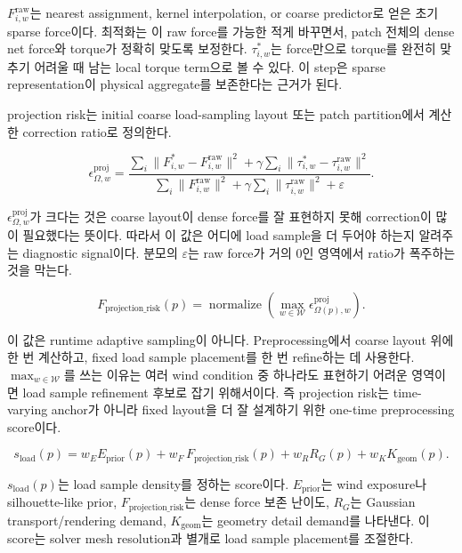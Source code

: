 \documentclass[11pt,a4paper]{article}
\newcommand{\normalize}{\operatorname{normalize}}
\newcommand{\eps}{\varepsilon}
\begin{document}
$F_{i,w}^{\mathrm{raw}}$는 nearest assignment, kernel interpolation, or coarse predictor로 얻은 초기 sparse force이다.
최적화는 이 raw force를 가능한 적게 바꾸면서, patch 전체의 dense net force와 torque가 정확히 맞도록 보정한다.
$\tau_{i,w}^{*}$는 force만으로 torque를 완전히 맞추기 어려울 때 남는 local torque term으로 볼 수 있다.
이 step은 sparse representation이 physical aggregate를 보존한다는 근거가 된다.

projection risk는 initial coarse load-sampling layout 또는 patch partition에서 계산한 correction ratio로 정의한다.

\begin{equation}
\epsilon_{\Omega,w}^{\mathrm{proj}}=\frac{\sum_i\|F_{i,w}^{*}-F_{i,w}^{\mathrm{raw}}\|^2+\gamma\sum_i\|\tau_{i,w}^{*}-\tau_{i,w}^{\mathrm{raw}}\|^2}{\sum_i\|F_{i,w}^{\mathrm{raw}}\|^2+\gamma\sum_i\|\tau_{i,w}^{\mathrm{raw}}\|^2+\eps}.
\end{equation}

$\epsilon_{\Omega,w}^{\mathrm{proj}}$가 크다는 것은 coarse layout이 dense force를 잘 표현하지 못해 correction이 많이 필요했다는 뜻이다.
따라서 이 값은 어디에 load sample을 더 두어야 하는지 알려주는 diagnostic signal이다.
분모의 $\eps$는 raw force가 거의 0인 영역에서 ratio가 폭주하는 것을 막는다.

\begin{equation}
F_{\mathrm{projection\_risk}}(p)=\normalize\left(\max_{w\in\mathcal{W}}\epsilon_{\Omega(p),w}^{\mathrm{proj}}\right).
\end{equation}

이 값은 runtime adaptive sampling이 아니다. Preprocessing에서 coarse layout 위에 한 번 계산하고, fixed load sample placement를 한 번 refine하는 데 사용한다.
$\max_{w\in\mathcal{W}}$를 쓰는 이유는 여러 wind condition 중 하나라도 표현하기 어려운 영역이면 load sample refinement 후보로 잡기 위해서이다.
즉 projection risk는 time-varying anchor가 아니라 fixed layout을 더 잘 설계하기 위한 one-time preprocessing score이다.

\begin{equation}
s_{\mathrm{load}}(p)=w_EE_{\mathrm{prior}}(p)+w_F\,F_{\mathrm{projection\_risk}}(p)+w_RR_G(p)+w_KK_{\mathrm{geom}}(p).
\end{equation}

$s_{\mathrm{load}}(p)$는 load sample density를 정하는 score이다.
$E_{\mathrm{prior}}$는 wind exposure나 silhouette-like prior, $F_{\mathrm{projection\_risk}}$는 dense force 보존 난이도, $R_G$는 Gaussian transport/rendering demand, $K_{\mathrm{geom}}$는 geometry detail demand를 나타낸다.
이 score는 solver mesh resolution과 별개로 load sample placement를 조절한다.
\end{document}
